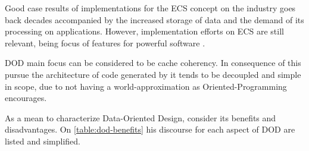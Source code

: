     Good case results of implementations for the ECS concept on the industry goes back decades \cite{leonard-thief-postmortem} accompanied by the increased storage of data and the demand of its processing on applications. However, implementation efforts on ECS are still relevant, being focus of features for powerful software \cite{johansson-ecs-unity-gdc-2018}.

    DOD main focus can be considered to be cache coherency. In consequence of this pursue the architecture of code generated by it tends to be decoupled and simple in scope, due to not having a world-approximation as Oriented-Programming encourages. 
    
    As a mean to characterize Data-Oriented Design, \cite{llopis-game-engine-gems-2} consider its benefits and disadvantages. On \autoref{table:dod-benefits} his discourse for each aspect of DOD are listed and simplified.

